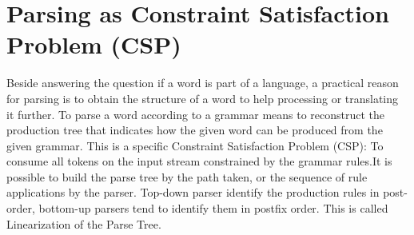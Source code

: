 \section{Parsing as Constraint Satisfaction Problem (CSP)} 
Beside answering the question if a word is part of a language, a practical reason for parsing is to obtain the structure of a word to help processing or translating it further. To parse a word according to a grammar means to reconstruct the production tree that indicates how the given word can be produced from the given grammar. This is a specific Constraint Satisfaction Problem (CSP): To consume all tokens on the input stream constrained by the grammar rules.It is possible to build the parse tree by the path taken, or the sequence of rule applications by the parser.  Top-down parser identify the production rules in post-order, bottom-up parsers tend to identify them in postfix order. This is called Linearization of the Parse Tree. \cite{ParserBook}

